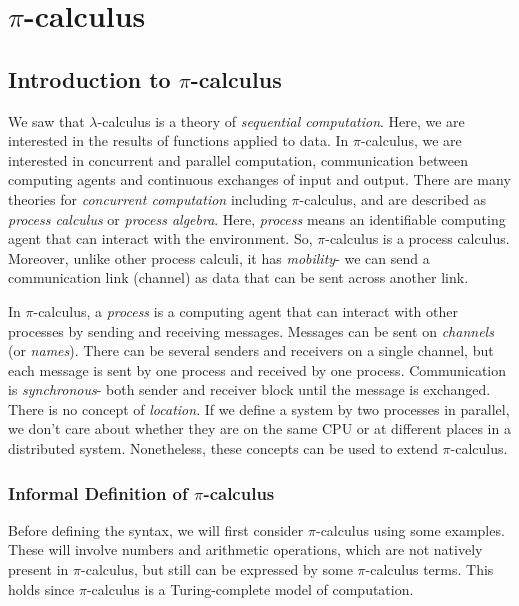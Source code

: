 \documentclass[a4paper, openany]{memoir}
\theoremstyle{definition}
\begin{document}
    \chapter{$\pi$-calculus}
    \section{Introduction to $\pi$-calculus}
    We saw that $\lambda$-calculus is a theory of \emph{sequential computation}. Here, we are interested in the results of functions applied to data. In $\pi$-calculus, we are interested in concurrent and parallel computation, communication between computing agents and continuous exchanges of input and output. There are many theories for \emph{concurrent computation} including $\pi$-calculus, and are described as \emph{process calculus} or \emph{process algebra}. Here, \emph{process} means an identifiable computing agent that can interact with the environment. So, $\pi$-calculus is a process calculus. Moreover, unlike other process calculi, it has \emph{mobility}- we can send a communication link (channel) as data that can be sent across another link.

    In $\pi$-calculus, a \emph{process} is a computing agent that can interact with other processes by sending and receiving messages. Messages can be sent on \emph{channels} (or \emph{names}). There can be several senders and receivers on a single channel, but each message is sent by one process and received by one process. Communication is \emph{synchronous}- both sender and receiver block until the message is exchanged. There is no concept of \emph{location}. If we define a system by two processes in parallel, we don't care about whether they are on the same CPU or at different places in a distributed system. Nonetheless, these concepts can be used to extend $\pi$-calculus.

    \subsection{Informal Definition of $\pi$-calculus}
    Before defining the syntax, we will first consider $\pi$-calculus using some examples. These will involve numbers and arithmetic operations, which are not natively present in $\pi$-calculus, but still can be expressed by some $\pi$-calculus terms. This holds since $\pi$-calculus is a Turing-complete model of computation. 
\end{document}
